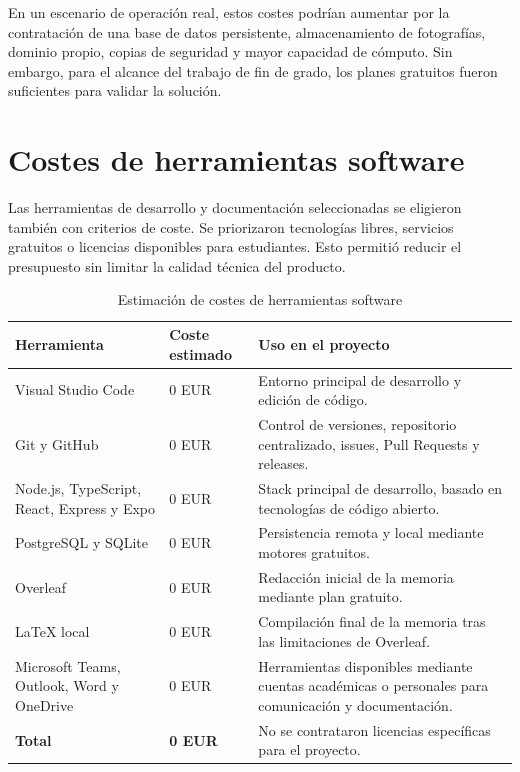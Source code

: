 En un escenario de operación real, estos costes podrían aumentar por la
contratación de una base de datos persistente, almacenamiento de fotografías,
dominio propio, copias de seguridad y mayor capacidad de cómputo. Sin embargo,
para el alcance del trabajo de fin de grado, los planes gratuitos fueron suficientes para validar la
solución.

\section{Costes de herramientas software}

Las herramientas de desarrollo y documentación seleccionadas se eligieron también
con criterios de coste. Se priorizaron tecnologías libres, servicios gratuitos o
licencias disponibles para estudiantes. Esto permitió reducir el presupuesto sin
limitar la calidad técnica del producto.

\begin{table}[H]
\centering
\caption{Estimación de costes de herramientas software}
\label{tab:costes_herramientas}
\small
\renewcommand{\arraystretch}{1.18}
\begin{tabularx}{\textwidth}{p{4.0cm}p{2.7cm}X}
\toprule
\textbf{Herramienta} & \textbf{Coste estimado} & \textbf{Uso en el proyecto} \\
\midrule
Visual Studio Code & 0 EUR & Entorno principal de desarrollo y edición de código. \\
Git y GitHub & 0 EUR & Control de versiones, repositorio centralizado, issues, Pull Requests y releases. \\
Node.js, TypeScript, React, Express y Expo & 0 EUR & Stack principal de desarrollo, basado en tecnologías de código abierto. \\
PostgreSQL y SQLite & 0 EUR & Persistencia remota y local mediante motores gratuitos. \\
Overleaf & 0 EUR & Redacción inicial de la memoria mediante plan gratuito. \\
LaTeX local & 0 EUR & Compilación final de la memoria tras las limitaciones de Overleaf. \\
Microsoft Teams, Outlook, Word y OneDrive & 0 EUR & Herramientas disponibles mediante cuentas académicas o personales para comunicación y documentación. \\
\midrule
\textbf{Total} & \textbf{0 EUR} & No se contrataron licencias específicas para el proyecto. \\
\bottomrule
\end{tabularx}
\end{table}

